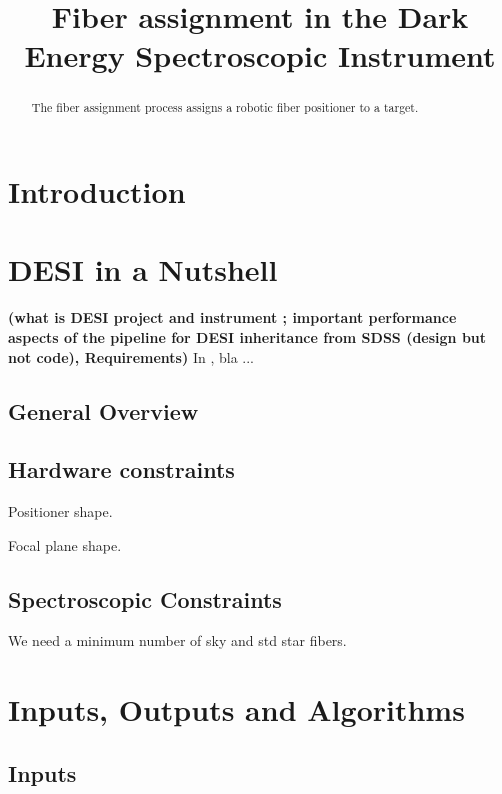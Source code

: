 \documentclass[onecolumn]{aastex63}
\newcommand{\TODO}[1]{{\bf (#1)}}
\begin{document}
\title{
Fiber assignment in the Dark Energy Spectroscopic Instrument 
}



\begin{abstract}
The fiber assignment process assigns a robotic fiber positioner to a target.\end{abstract}



\tableofcontents


\section{Introduction}


\section{DESI in a Nutshell}
\label{sec:Introduction}
\TODO{what is DESI project and instrument ; important performance aspects of the pipeline for DESI
  inheritance from SDSS (design but not code), Requirements}
In \cite{Bolton2012}, bla ... 

\subsection{General Overview}


\subsection{Hardware constraints}

Positioner shape.

Focal plane shape.


\subsection{Spectroscopic Constraints}

We need a minimum number of sky and std star fibers.

\section{Inputs, Outputs and Algorithms}

\subsection{Inputs}
\end{document}

